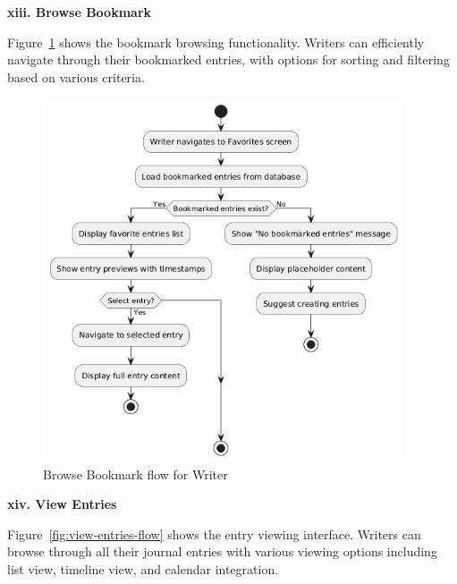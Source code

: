 \textbf{xiii. Browse Bookmark}


Figure~\ref{fig:browse-bookmark-flow} shows the bookmark browsing functionality. Writers can efficiently navigate through their bookmarked entries, with options for sorting and filtering based on various criteria.

\begin{figure}[H]
\centering
\includegraphics[width=0.95\textwidth,height=0.7\textheight,keepaspectratio]{files/imgs/browse_bookmark_flow.png}
\caption{Browse Bookmark flow for Writer}
\label{fig:browse-bookmark-flow}
\end{figure}
\clearpage

\textbf{xiv. View Entries}


Figure~\ref{fig:view-entries-flow} shows the entry viewing interface. Writers can browse through all their journal entries with various viewing options including list view, timeline view, and calendar integration.

